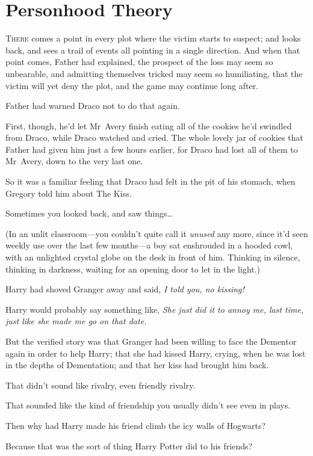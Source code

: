 \chapter{Personhood Theory}

\lettrine{T}{here} comes a point in every plot where the victim starts to suspect; and looks back, and sees a trail of events all pointing in a single direction. And when that point comes, Father had explained, the prospect of the loss may seem so unbearable, and admitting themselves tricked may seem so humiliating, that the victim will yet deny the plot, and the game may continue long after.

Father had warned Draco not to do that again.

First, though, he'd let Mr~Avery finish eating all of the cookies he'd swindled from Draco, while Draco watched and cried. The whole lovely jar of cookies that Father had given him just a few hours earlier, for Draco had lost all of them to Mr~Avery, down to the very last one.

So it was a familiar feeling that Draco had felt in the pit of his stomach, when Gregory told him about The Kiss.

Sometimes you looked back, and saw things{\ldots}

(In an unlit classroom—you couldn't quite call it \emph{unused} any more, since it'd seen weekly use over the last few months—a boy sat enshrouded in a hooded cowl, with an unlighted crystal globe on the desk in front of him. Thinking in silence, thinking in darkness, waiting for an opening door to let in the light.)

Harry had shoved Granger away and said, \emph{I told you, no kissing!}

Harry would probably say something like, \emph{She just did it to annoy me, last time, just like she made me go on that date.}

But the verified story was that Granger had been willing to face the Dementor again in order to help Harry; that she had kissed Harry, crying, when he was lost in the depths of Dementation; and that her kiss had brought him back.

That didn't sound like rivalry, even friendly rivalry.

That sounded like the kind of friendship you usually didn't see even in plays.

Then why had Harry made his friend climb the icy walls of Hogwarts?

Because that was the sort of thing Harry Potter did to his friends?

